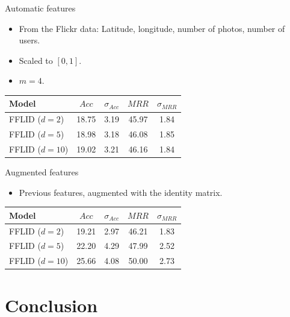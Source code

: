 \documentclass{beamer}
\begin{document}
  \begin{frame}{Automatic features}
    \begin{itemize}
      \item From the Flickr data: Latitude, longitude, number of photos, number of users.
      \item Scaled to $[0,1]$.
      \item $m = 4$.
    \end{itemize}
    \begin{table}
      \begin{tabularx}{0.7\textwidth}{X|c|c|c|c}
        Model          & $Acc$ & $\sigma_{Acc}$ & $MRR$ & $\sigma_{MRR}$ \\
        \hline
        FFLID ($d=2$)  & 18.75 & 3.19 & 45.97 & 1.84 \\
        FFLID ($d=5$)  & 18.98 & 3.18 & 46.08 & 1.85 \\
        FFLID ($d=10$) & 19.02 & 3.21 & 46.16 & 1.84
      \end{tabularx}
    \end{table}
  \end{frame}
  
  \begin{frame}{Augmented features}
    \begin{itemize}
      \item Previous features, augmented with the identity matrix.
    \end{itemize}
    \begin{table}
      \begin{tabularx}{0.7\textwidth}{X|c|c|c|c}
        Model          & $Acc$ & $\sigma_{Acc}$ & $MRR$ & $\sigma_{MRR}$ \\
        \hline
        FFLID ($d=2$)  & 19.21 & 2.97 & 46.21 & 1.83 \\
        FFLID ($d=5$)  & 22.20 & 4.29 & 47.99 & 2.52 \\
        FFLID ($d=10$) & 25.66 & 4.08 & 50.00 & 2.73
      \end{tabularx}
    \end{table}
  \end{frame}
  
  \section{Conclusion}
  
\end{document}
